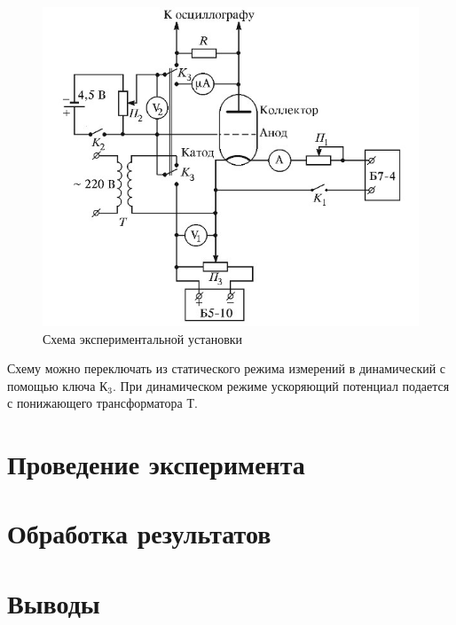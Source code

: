 \documentclass[14pt, a4paper]{report}
\begin{document}
\begin{figure}[H]
\centering
\includegraphics[scale=0.6]{../images/521-3}
\caption{Схема экспериментальной установки}
\end{figure}

Схему можно переключать из статического режима измерений в динамический  с помощью ключа $К_3$. При динамическом режиме ускоряющий потенциал подается с понижающего трансформатора Т.

\section{Проведение эксперимента}

\section{Обработка результатов}

\section{Выводы}
\end{document}
